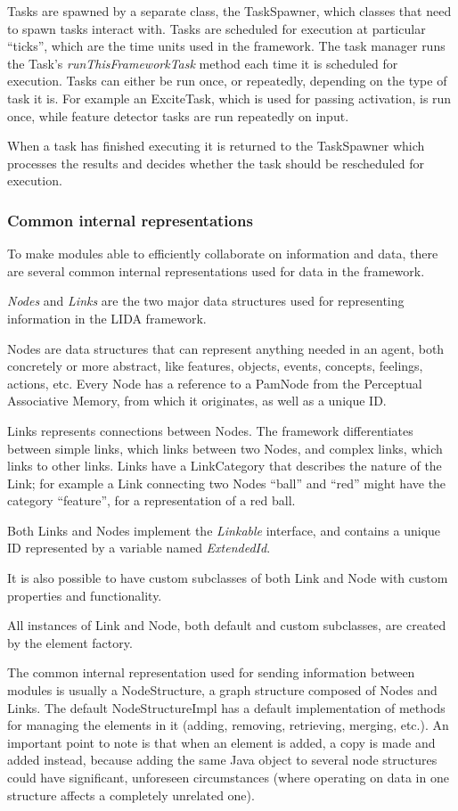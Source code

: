 Tasks are spawned by a separate class, the TaskSpawner, which classes that need to spawn tasks interact with. Tasks are scheduled for execution at particular ``ticks'', which are the time units used in the framework. The task manager runs the Task's {\em runThisFrameworkTask} method each time it is scheduled for execution. Tasks can either be run once, or repeatedly, depending on the type of task it is. For example an ExciteTask, which is used for passing activation, is run once, while feature detector tasks are run repeatedly on input.

When a task has finished executing it is returned to the TaskSpawner which processes the results and decides whether the task should be rescheduled for execution.

\subsubsection{Common internal representations}
To make modules able to efficiently collaborate on information and data, there are several common internal representations used for data in the framework.

{\em Nodes} and {\em Links} are the two major data structures used for representing information in the LIDA framework.

Nodes are data structures that can represent anything needed in an agent, both concretely or more abstract, like features, objects, events, concepts, feelings, actions, etc. Every Node has a reference to a PamNode from the Perceptual Associative Memory, from which it originates, as well as a unique ID.

Links represents connections between Nodes. The framework differentiates between simple links, which links between two Nodes, and complex links, which links to other links. Links have a LinkCategory that describes the nature of the Link; for example a Link connecting two Nodes ``ball'' and ``red'' might have the category ``feature'', for a representation of a red ball.

Both Links and Nodes implement the {\em Linkable} interface, and contains a unique ID represented by a variable named {\em ExtendedId}.

It is also possible to have custom subclasses of both Link and Node with custom properties and functionality.

All instances of Link and Node, both default and custom subclasses, are created by the element factory.

The common internal representation used for sending information between modules is usually a NodeStructure, a graph structure composed of Nodes and Links. The default NodeStructureImpl has a default implementation of methods for managing the elements in it (adding, removing, retrieving, merging, etc.). An important point to note is that when an element is added, a copy is made and added instead, because adding the same Java object to several node structures could have significant, unforeseen circumstances (where operating on data in one structure affects a completely unrelated one).

